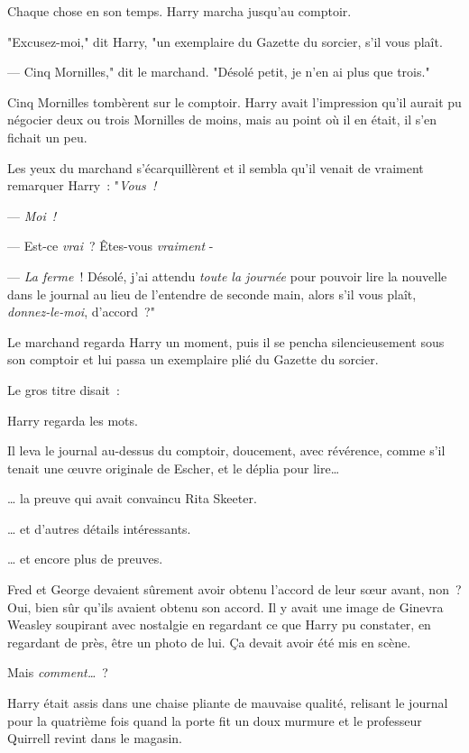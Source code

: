 Chaque chose en son temps. Harry marcha jusqu'au comptoir.

"Excusez-moi," dit Harry, "un exemplaire du Gazette du sorcier, s'il vous plaît.

--- Cinq Mornilles," dit le marchand. "Désolé petit, je n'en ai plus que trois."

Cinq Mornilles tombèrent sur le comptoir. Harry avait l'impression qu'il aurait pu négocier deux ou trois Mornilles de moins, mais au point où il en était, il s'en fichait un peu.

Les yeux du marchand s'écarquillèrent et il sembla qu'il venait de vraiment remarquer Harry~: "\emph{Vous~!}

--- \emph{Moi~!}

--- Est-ce \emph{vrai}~? Êtes-vous \emph{vraiment} -

--- \emph{La ferme}~! Désolé, j'ai attendu \emph{toute la journée} pour pouvoir lire la nouvelle dans le journal au lieu de l'entendre de seconde main, alors s'il vous plaît, \emph{donnez-le-moi}, d'accord~?"

Le marchand regarda Harry un moment, puis il se pencha silencieusement sous son comptoir et lui passa un exemplaire plié du Gazette du sorcier.

Le gros titre disait~:

Harry regarda les mots.

Il leva le journal au-dessus du comptoir, doucement, avec révérence, comme s'il tenait une œuvre originale de Escher, et le déplia pour lire…

… la preuve qui avait convaincu Rita Skeeter.

… et d'autres détails intéressants.

… et encore plus de preuves.

Fred et George devaient sûrement avoir obtenu l'accord de leur sœur avant, non~? Oui, bien sûr qu'ils avaient obtenu son accord. Il y avait une image de Ginevra Weasley soupirant avec nostalgie en regardant ce que Harry pu constater, en regardant de près, être un photo de lui. Ça devait avoir été mis en scène.

Mais \emph{comment…}~?

Harry était assis dans une chaise pliante de mauvaise qualité, relisant le journal pour la quatrième fois quand la porte fit un doux murmure et le professeur Quirrell revint dans le magasin.

